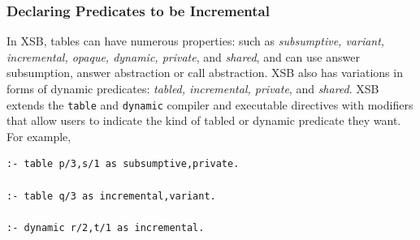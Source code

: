 %
%
%
%
\subsubsection{Declaring Predicates to be Incremental}
%
In XSB, tables can have numerous properties: such as {\em subsumptive,
  variant, incremental, opaque, dynamic, private}, and {\em shared},
and can use answer subsumption, answer abstraction or call
abstraction.  XSB also has variations in forms of dynamic predicates:
{\em tabled, incremental, private}, and {\em shared}.  XSB extends the
{\tt table} and {\tt dynamic} compiler and executable directives with
modifiers that allow users to indicate the kind of tabled or dynamic
predicate they want.  For example,
%
\begin{verbatim}
:- table p/3,s/1 as subsumptive,private.

:- table q/3 as incremental,variant.

:- dynamic r/2,t/1 as incremental.
\end{verbatim}

